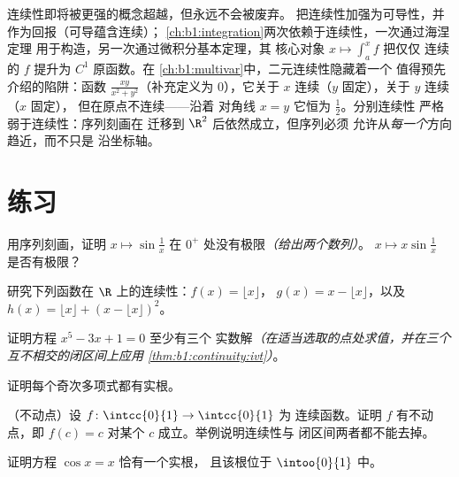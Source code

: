 \begin{remark}[本分册内的展望]
连续性即将被更强的概念超越，但永远不会被废弃。
把连续性加强为可导性，并
作为回报（可导蕴含连续）；
\cref{ch:b1:integration}两次依赖于连续性，一次通过海涅定理
用于构造，另一次通过微积分基本定理，其
核心对象 $x \mapsto \int_a^x f$ 把仅仅
连续的 $f$ 提升为 $C^1$ 原函数。在
\cref{ch:b1:multivar}中，二元连续性隐藏着一个
值得预先介绍的陷阱：函数 $\frac{xy}{x^2 + y^2}$（补充定义为
$0$），它关于 $x$ 连续（$y$ 固定），关于 $y$ 连续（$x$ 固定），
但在原点不连续——沿着
对角线 $x = y$ 它恒为 $\frac12$。分别连续性
严格弱于连续性：序列刻画在
迁移到 $\R^2$ 后依然成立，但序列必须
允许从\emph{每一个}方向趋近，而不只是
沿坐标轴。
\end{remark}

\section{练习}

\begin{exercise}[$\star$]\label{exo:b1:continuity:1}
用序列刻画，证明 $x \mapsto
\sin\frac 1x$ 在 $0^+$ 处没有极限\emph{（给出两个数列）}。
$x \mapsto x \sin\frac 1x$ 是否有极限？
\end{exercise}

\begin{exercise}[$\star$]\label{exo:b1:continuity:2}
研究下列函数在 $\R$ 上的连续性：$f(x) = \lfloor x \rfloor$，
$g(x) = x - \lfloor x \rfloor$，以及 $h(x) = \lfloor x \rfloor +
(x - \lfloor x\rfloor)^2$。
\end{exercise}

\begin{exercise}[$\star$]\label{exo:b1:continuity:3}
证明方程 $x^5 - 3x + 1 = 0$ 至少有三个
实数解\emph{（在适当选取的点处求值，并在三个互不相交的闭区间上应用
\cref{thm:b1:continuity:ivt}）}。
\end{exercise}

\begin{exercise}[$\star$]\label{exo:b1:continuity:4}
证明每个奇次多项式都有实根。
\end{exercise}

\begin{exercise}[$\star\star$]\label{exo:b1:continuity:5}
（不动点）设 $f \colon \intcc{0}{1} \to \intcc{0}{1}$ 为
连续函数。证明 $f$ 有不动点，即 $f(c) = c$ 对某个
$c$ 成立。举例说明连续性与
闭区间两者都不能去掉。
\end{exercise}

\begin{exercise}[$\star\star$]\label{exo:b1:continuity:6}
证明方程 $\cos x = x$ 恰有一个实根，
且该根位于 $\intoo{0}{1}$ 中。
\end{exercise}

